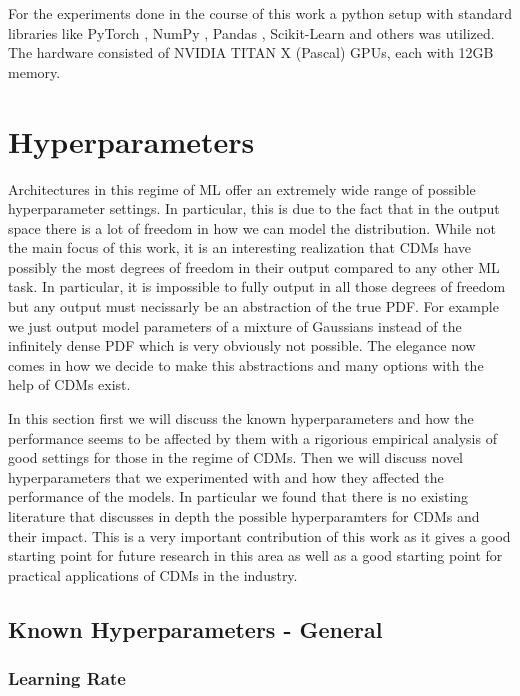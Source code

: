 For the experiments done in the course of this work a python setup with standard libraries like PyTorch \cite{paszke2019pytorch}, NumPy \cite{harris2020array}, Pandas \cite{reback2020pandas}, Scikit-Learn \cite{scikit-learn} and others was utilized. The hardware consisted of NVIDIA TITAN X (Pascal) GPUs, each with 12GB memory.

\section{Hyperparameters}\label{sec:hyperparameters}

Architectures in this regime of ML offer an extremely wide range of possible hyperparameter settings. In particular, this is due to the fact that in the output space there is a lot of freedom in how we can model the distribution. While not the main focus of this work, it is an interesting realization that CDMs have possibly the most degrees of freedom in their output compared to any other ML task. In particular, it is impossible to fully output in all those degrees of freedom but any output must necissarly be an abstraction of the true PDF. For example we just output model parameters of a mixture of Gaussians instead of the infinitely dense PDF which is very obviously not possible. The elegance now comes in how we decide to make this abstractions and many options with the help of CDMs exist.

In this section first we will discuss the known hyperparameters and how the performance seems to be affected by them with a rigorious empirical analysis of good settings for those in the regime of CDMs. Then we will discuss novel hyperparameters that we experimented with and how they affected the performance of the models. In particular we found that there is no existing literature that discusses in depth the possible hyperparamters for CDMs and their impact. This is a very important contribution of this work as it gives a good starting point for future research in this area as well as a good starting point for practical applications of CDMs in the industry.

\subsection{Known Hyperparameters - General}

\subsubsection{Learning Rate}

